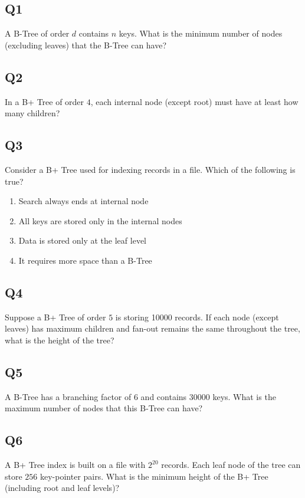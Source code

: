 \subsection*{Q1}
A B-Tree of order $d$ contains $n$ keys. What is the minimum number of nodes (excluding leaves) that the B-Tree can have?

\subsection*{Q2}
In a B+ Tree of order $4$, each internal node (except root) must have at least how many children?

\subsection*{Q3}
Consider a B+ Tree used for indexing records in a file. Which of the following is true?  

\begin{enumerate}[label=(\alph*)]
    \item Search always ends at internal node  
    \item All keys are stored only in the internal nodes
    \item Data is stored only at the leaf level
    \item It requires more space than a B-Tree
\end{enumerate}

\subsection*{Q4}
Suppose a B+ Tree of order $5$ is storing 10000 records. If each node (except leaves) has maximum children and fan-out remains the same throughout the tree, what is the height of the tree?

\subsection*{Q5}
A B-Tree has a branching factor of $6$ and contains $30000$ keys. What is the maximum number of nodes that this B-Tree can have?

\subsection*{Q6}
A B+ Tree index is built on a file with $2^{20}$ records. Each leaf node of the tree can store $256$ key-pointer pairs. What is the minimum height of the B+ Tree (including root and leaf levels)?

